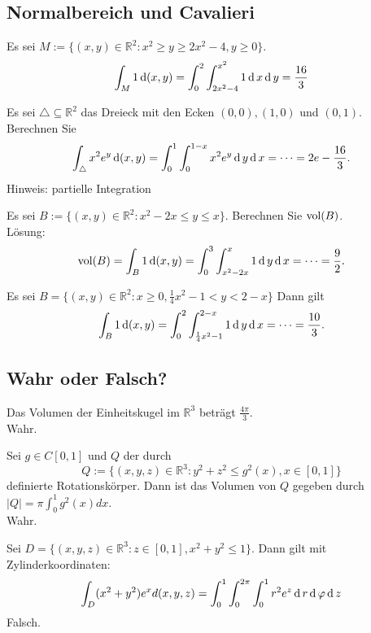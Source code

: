\documentclass[parskip=full]{scrartcl}
\begin{document}
\subsection{Normalbereich und Cavalieri}
Es sei $M := \{(x,y) \in \mathbb{R}^2 : x^2 \geq y \geq 2x^2 - 4, y \geq 0\}$.
\begin{displaymath}
  \int_M 1 \operatorname{\mathop{}\!\mathrm{d}} (x,y) = \int_0^2 \int_{2x^2 - 4}^{x^2} 1 \operatorname{\mathop{}\!\mathrm{d}} x \operatorname{\mathop{}\!\mathrm{d}} y = \frac{16}{3}
\end{displaymath}

Es sei $\triangle \subseteq \mathbb{R}^2$ das Dreieck mit den Ecken $(0,0), (1,0)$ und $(0,1)$.
Berechnen Sie
\begin{displaymath}
  \int_{\triangle} x^2e^y \operatorname{\mathop{}\!\mathrm{d}} (x,y) = \int_0^1 \int_0^{1 - x} x^2 e^y \operatorname{\mathop{}\!\mathrm{d}} y \operatorname{\mathop{}\!\mathrm{d}} x = \dots = 2e - \frac{16}{3}.
\end{displaymath}
Hinweis: partielle Integration

Es sei $B := \{(x,y) \in \mathbb{R}^2 : x^2 - 2x \leq y \leq x\}$.
Berechnen Sie $\operatorname{vol}(B)$.\\
Lösung:
\begin{displaymath}
  \operatorname{vol}(B) = \int_B 1 \operatorname{\mathop{}\!\mathrm{d}}(x,y) = \int_0^3 \int_{x^2 - 2x}^{x} 1 \operatorname{\mathop{}\!\mathrm{d}} y \operatorname{\mathop{}\!\mathrm{d}} x = \dots = \frac{9}{2}.
\end{displaymath}

Es sei $B = \{(x,y) \in \mathbb{R}^2 : x \geq 0, \frac{1}{4}x^2 - 1 < y < 2 - x\}$
Dann gilt
\begin{displaymath}
  \int_B 1 \operatorname{\mathop{}\!\mathrm{d}}(x,y) = \int_0^2 \int_{\frac{1}{4}x^2 - 1}^{2 - x} 1 \operatorname{\mathop{}\!\mathrm{d}} y \operatorname{\mathop{}\!\mathrm{d}} x = \dots = \frac{10}{3}.
\end{displaymath}

\subsection{Wahr oder Falsch?}
Das Volumen der Einheitskugel im $\mathbb{R}^3$ beträgt $\frac{4\pi}{3}$.\\
Wahr.

Sei $g \in C[0,1]$ und $Q$ der durch
\begin{displaymath}
  Q := \{(x,y,z) \in \mathbb{R}^3 : y^2 + z^2 \leq g^2(x), x \in [0,1]\}
\end{displaymath}
definierte Rotationskörper.
Dann ist das Volumen von $Q$ gegeben durch $|Q| = \pi \int_{0}^{1} g^2(x)dx$.\\
Wahr.

Sei $D = \{(x,y,z) \in \mathbb{R}^3 : z \in [0,1], x^2 + y^2 \leq 1\}$.
Dann gilt mit Zylinderkoordinaten:
\begin{displaymath}
  \int_D (x^2 + y^2)e^x d(x,y,z) = \int_0^1 \int_0^{2\pi} \int_0^1 r^2 e^z \operatorname{\mathop{}\!\mathrm{d}} r \operatorname{\mathop{}\!\mathrm{d}} \varphi \operatorname{\mathop{}\!\mathrm{d}} z
\end{displaymath}
Falsch.
\end{document}
